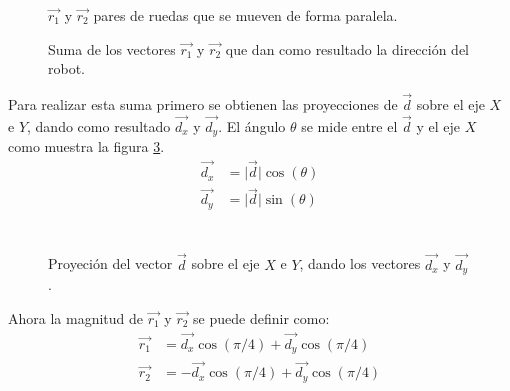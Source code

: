 \documentclass{iccmemoria}
\begin{document}
\begin{figure}[H]
  \centering
  \begin{large}
  
  \end{large}
  \caption{$\vec{r_{1}}$ y $\vec{r_{2}}$ pares de ruedas que se mueven de forma paralela.}
  \label{fig:omni_vector}
\end{figure}

\begin{figure}[H]
  \centering
  \begin{large}
  
  \end{large}
  \caption{Suma de los vectores $\vec{r_{1}}$ y $\vec{r_{2}}$ que dan como resultado la dirección del robot.}
  \label{fig:vec_sum}
\end{figure}

Para realizar esta suma primero se obtienen las proyecciones de $\vec{d}$ sobre el eje $X$ e $Y$, dando como resultado $\vec{d_{x}}$ y $\vec{d_{y}}$. El ángulo $\theta$ se mide entre el $\vec{d}$ y el eje $X$ como muestra la figura \ref{fig:vec_proyection}.\\

\begin{equation}
	\begin{split}
	\vec{d_{x}} & = \lvert \vec{d} \rvert \cos(\theta)\\
	\vec{d_{y}} & = \lvert \vec{d} \rvert \sin(\theta)\\
	\end{split}
\end{equation}\\

\begin{figure}[H]
  \centering
  \begin{large}
  
  \end{large}
  \caption{Proyeción del vector $\vec{d}$ sobre el eje $X$ e $Y$, dando los vectores $\vec{d_{x}}$ y $\vec{d_{y}}$ .}
  \label{fig:vec_proyection}
\end{figure}

Ahora la magnitud de $\vec{r_{1}}$ y $\vec{r_{2}}$ se puede definir como:\\

\begin{equation}
	\begin{split}
	\vec{r_{1}} & = \vec{d_{x}}\cos(\pi/4)  + \vec{d_{y}}\cos(\pi/4)\\
	\vec{r_{2}} & = -\vec{d_{x}}\cos(\pi/4) + \vec{d_{y}}\cos(\pi/4)\\
	\end{split}
\end{equation}\\
\end{document}
